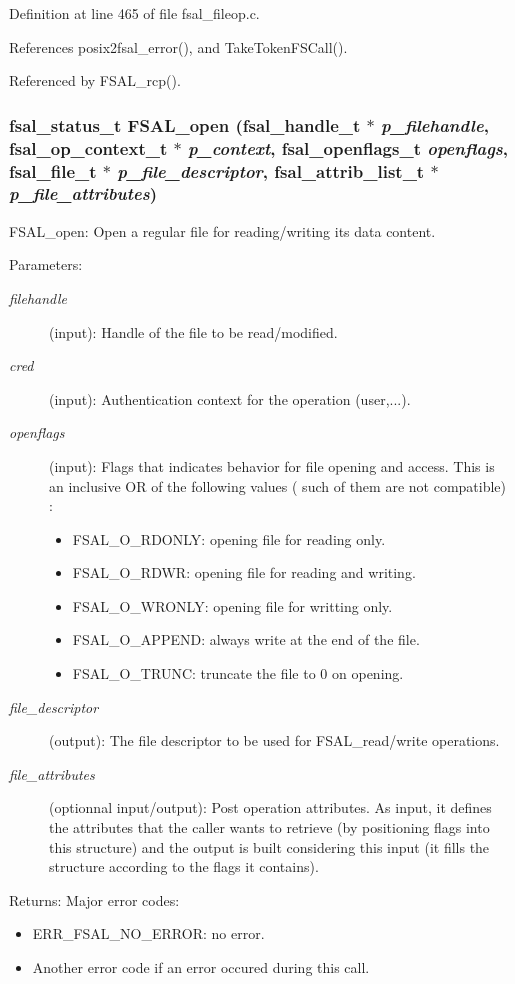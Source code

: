 Definition at line 465 of file fsal\_\-fileop.c.

References posix2fsal\_\-error(), and Take\-Token\-FSCall().

Referenced by FSAL\_\-rcp().
\subsubsection{\setlength{\rightskip}{0pt plus 5cm}fsal\_\-status\_\-t FSAL\_\-open (fsal\_\-handle\_\-t $\ast$ {\em p\_\-filehandle}, fsal\_\-op\_\-context\_\-t $\ast$ {\em p\_\-context}, fsal\_\-openflags\_\-t {\em openflags}, fsal\_\-file\_\-t $\ast$ {\em p\_\-file\_\-descriptor}, fsal\_\-attrib\_\-list\_\-t $\ast$ {\em p\_\-file\_\-attributes})}\label{fsal__fileop_8c_a1}


FSAL\_\-open: Open a regular file for reading/writing its data content.

\begin{Desc}
\item[Parameters:]
\begin{description}
\item[{\em filehandle}](input): Handle of the file to be read/modified. \item[{\em cred}](input): Authentication context for the operation (user,...). \item[{\em openflags}](input): Flags that indicates behavior for file opening and access. This is an inclusive OR of the following values ( such of them are not compatible) :\begin{itemize}
\item FSAL\_\-O\_\-RDONLY: opening file for reading only.\item FSAL\_\-O\_\-RDWR: opening file for reading and writing.\item FSAL\_\-O\_\-WRONLY: opening file for writting only.\item FSAL\_\-O\_\-APPEND: always write at the end of the file.\item FSAL\_\-O\_\-TRUNC: truncate the file to 0 on opening. \end{itemize}
\item[{\em file\_\-descriptor}](output): The file descriptor to be used for FSAL\_\-read/write operations. \item[{\em file\_\-attributes}](optionnal input/output): Post operation attributes. As input, it defines the attributes that the caller wants to retrieve (by positioning flags into this structure) and the output is built considering this input (it fills the structure according to the flags it contains).\end{description}
\end{Desc}
\begin{Desc}
\item[Returns:]Major error codes:\begin{itemize}
\item ERR\_\-FSAL\_\-NO\_\-ERROR: no error.\item Another error code if an error occured during this call. \end{itemize}
\end{Desc}


